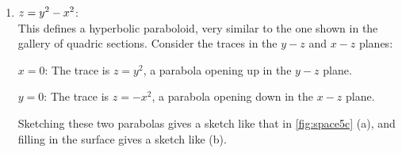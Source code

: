\begin{example}
\begin{enumerate}
	$y=0$:	The trace is the ellipse $\ds x^2+\frac{z^2}{4}=1.$ The major axis is along the $z$-axis, and the minor axis has length 2 along the $x$-axis.
	
	$z=0$:	The trace is the ellipse $\ds x^2+\frac{y^2}{9}=1,$ with major axis along the $y$-axis. 
	
	Graphing each trace in the respective plane creates a sketch as shown in \autoref{fig:space5b}(a). Filling in the surface gives \autoref{fig:space5b}(b).
	
	\item		$\displaystyle z=y^2-x^2$:\\
	This defines a hyperbolic paraboloid, very similar to the one shown in the gallery of quadric sections. Consider the traces in the $y-z$ and $x-z$ planes:

	$x=0$: 	The trace is $z=y^2$, a parabola opening up in the $y-z$ plane.
	
	$y=0$: 	The trace is $z=-x^2$, a parabola opening down in the $x-z$ plane. 
	
	Sketching these two parabolas gives a sketch like that in \autoref{fig:space5c} (a), and filling in the surface gives a sketch like (b).
\end{enumerate}
\end{example}

